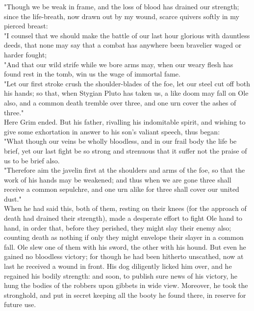\documentclass[10pt,a4paper]{report}
\begin{document}
"Though we be weak in frame, and the loss of blood has drained our strength; since the life-breath, now drawn out by my wound, scarce quivers softly in my pierced breast:\\

"I counsel that we should make the battle of our last hour glorious with dauntless deeds, that none may say that a combat has anywhere been bravelier waged or harder fought;\\

"And that our wild strife while we bore arms may, when our weary flesh has found rest in the tomb, win us the wage of immortal fame.\\

"Let our first stroke crush the shoulder-blades of the foe, let our steel cut off both his hands; so that, when Stygian Pluto has taken us, a like doom may fall on Ole also, and a common death tremble over three, and one urn cover the ashes of three."\\

Here Grim ended. But his father, rivalling his indomitable spirit, and wishing to give some exhortation in answer to his son's valiant speech, thus began:\\

"What though our veins be wholly bloodless, and in our frail body the life be brief, yet our last fight be so strong and strenuous that it suffer not the praise of us to be brief also.\\

"Therefore aim the javelin first at the shoulders and arms of the foe, so that the work of his hands may be weakened; and thus when we are gone three shall receive a common sepulchre, and one urn alike for three shall cover our united dust."\\

When he had said this, both of them, resting on their knees (for the approach of death had drained their strength), made a desperate effort to fight Ole hand to hand, in order that, before they perished, they might slay their enemy also; counting death as nothing if only they might envelope their slayer in a common fall. Ole slew one of them with his sword, the other with his hound. But even he gained no bloodless victory; for though he had been hitherto unscathed, now at last he received a wound in front. His dog diligently licked him over, and he regained his bodily strength: and soon, to publish sure news of his victory, he hung the bodies of the robbers upon gibbets in wide view. Moreover, he took the stronghold, and put in secret keeping all the booty he found there, in reserve for future use.\\
\end{document}

